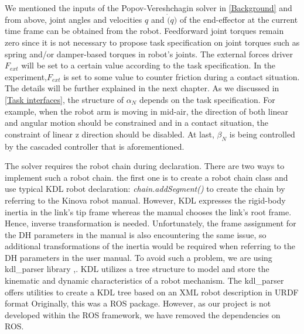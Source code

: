 \documentclass[report.tex]{subfiles}
\begin{document}
    We mentioned the inputs of the Popov-Vereshchagin solver in \ref{Background} and from above, joint angles and velocities $q$ and $\dot(q)$ of the end-effector at the current time frame can be obtained from the robot. Feedforward joint torques remain zero since it is not necessary to propose task specification on joint torques such as spring and/or damper-based torques in robot's joints\cite{Vukcevic2020}. The external forces driver $F_{ext}$ will be set to a certain value according to the task specification. In the experiment,$F_{ext}$ is set to some value to counter friction during a contact situation. The details will be further explained in the next chapter.
    As we discussed in \ref{Task interfaces}, the structure of $\alpha_N$ depends on the task specification. For example, when the robot arm is moving in mid-air, the direction of both linear and angular motion should be constrained and in a contact situation, the constraint of linear z direction should be disabled. At last, $\beta_N$ is being controlled by the cascaded controller that is aforementioned.

    The solver requires the robot chain during declaration. There are two ways to implement such a robot chain. the first one is to create a robot chain class and use typical KDL robot declaration: \textit{chain.addSegment()} to create the chain by referring to the Kinova robot manual. However, KDL expresses the rigid-body inertia in the link's tip frame whereas the manual chooses the link's root frame. Hence, inverse transformation is needed. Unfortunately, the frame assignment for the DH parameters in the manual is also encountering the same issue, so additional transformations of the inertia would be required when referring to the DH parameters in the user manual. To avoid such a problem, we are using kdl\_parser library \cite{kdl_parser},\cite{roskdlparser}. KDL utilizes a tree structure to model and store the kinematic and dynamic characteristics of a robot mechanism. The kdl\_parser offers utilities to create a KDL tree based on an XML robot description in URDF format Originally, this was a ROS package. However, as our project is not developed within the ROS framework, we have removed the dependencies on ROS.
\end{document}
